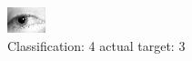 \begin{figure}[h!]
\begin{center}
\includegraphics[width=0.60\columnwidth]{figures/ID1302_class_4_target_3.png}
\end{center}
\caption{ Classification: 4 actual target: 3}
\label{fig:ID1302_class_4_target_3}
\end{figure}
